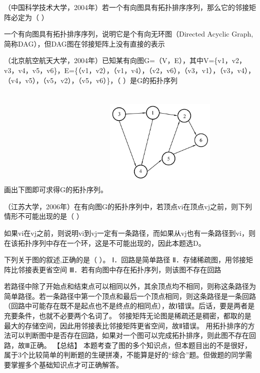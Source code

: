 \question （中国科学技术大学，2004年）若一个有向图具有拓扑排序序列，那么它的邻接矩阵必定为（
）
\par{}
\begin{solution}一个有向图具有拓扑排序序列，说明它是个有向无环图（Directed Acyclic
Graph,简称DAG），但DAG图在邻接矩阵上没有直接的表示
\end{solution}
\question （北京航空航天大学，2004年）已知某有向图G=（V，E），其中V=\{v1，v2，v3，v4，v5，v6\}，E=\{（v1，v2），（v1，v4），（v2，v6），（v3，v1），（v3，v4），（v4，v5），（v5，v2），（v5，v6）\}，（
）是G的拓扑序列
\par{}
\begin{solution}画出下图即可求得G的拓扑序列。
\includegraphics[width=2.08333in,height=2.08333in]{computerassets/81eae3ad3bd2585a68b0b81f131f8a7e.jpeg}
\end{solution}
\question （江苏大学，2006年）在有向图G的拓扑序列中，若顶点vi在顶点vj之前，则下列情形不可能出现的是（
）
\par{}
\begin{solution}如果vi在vj之前，则说明vi到vj一定有一条路径，而如果从vj也有一条路径到vi，则在该拓扑序列中存在一个环，这是不可能出现的，因此本题选D。
\end{solution}
\question 下列关于图的叙述,正确的是（ ）。 Ⅰ．回路是简单路径
Ⅱ．存储稀疏图，用邻接矩阵比邻接表更省空间
Ⅲ．若有向图中存在拓扑序列，则该图不存在回路
\par{}
\begin{solution}若路径中除了开始点和结束点可以相同以外，其余顶点均不相同，则称这条路径为简单路径。若一条路径中第一个顶点和最后一个顶点相同，则这条路径是一条回路（回路中可能存在既不是起点也不是终点的相同点），故Ⅰ错误。后话，要是两者是充要条件，也就不必要两个名词了。
邻接矩阵无论图是稀疏还是稠密，都取的是最大的存储空间，因此用邻接表比邻接矩阵更省空间，故Ⅱ错误。
用拓扑排序的方法可以判断图中是否存在回路，如果对一个图可以完成拓扑排序，则此图不存在回路，故Ⅲ正确。
【总结】
本题考查了图的多个知识点，但本题目出的不是很好，属于3个比较简单的判断题的生硬拼凑，不能算是好的``综合''题。但做题的同学需要掌握多个基础知识点才可正确解答。
\end{solution}
